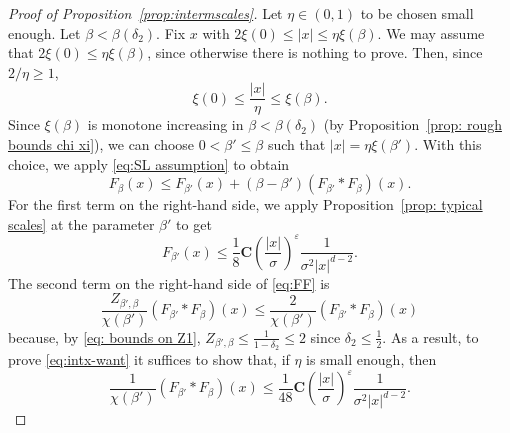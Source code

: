 \documentclass[11pt,a4paper]{article}
\numberwithin{equation}{section}
\theoremstyle{plain}
\theoremstyle{definition}
\newcommand\1{\mathds{1}}
\newcommand\bfC{\mathbf{C}}
\begin{document}
\begin{proof}[Proof of Proposition~\textup{\ref{prop:intermscales}}]
Let $\eta\in(0,1)$ to be chosen small enough.
Let $\beta<\beta(\delta_2)$.
Fix $x$ with $2\xi(0)\leq |x|\leq \eta \xi(\beta)$.
We may assume that $2\xi(0) \le \eta \xi(\beta)$, since otherwise there is nothing to prove. Then, since $2/\eta \ge 1$,
\begin{equation}
    \xi(0)  \le \frac{|x|}\eta \le \xi(\beta).
\end{equation}
Since $\xi(\beta)$ is monotone increasing in
$\beta <\beta(\delta_2)$ (by Proposition~\ref{prop: rough bounds chi xi}), we can choose
$0< \beta' \le \beta$ such that
$|x|=\eta\xi(\beta')$.  With this choice, we apply
\eqref{eq:SL assumption} to obtain
\begin{equation}
\label{eq:FF}
	F_\beta(x)\leq F_{\beta'}(x)+(\beta-\beta')(F_{\beta'}*F_\beta)(x).
\end{equation}
For the first term on the right-hand side, we
apply Proposition~\ref{prop: typical scales} at the parameter $\beta'$ to get
\begin{equation}
	F_{\beta'}(x)\leq
    \frac{1}{8} \bfC \left(\frac{|x|}{\sigma}\right)^\varepsilon
    \frac{1}{\sigma^2 |x|^{d-2}}.
\end{equation}
The second term on the right-hand side of \eqref{eq:FF} is
\begin{equation}
    \frac{Z_{\beta',\beta}}{\chi(\beta')}
    (F_{\beta'}*F_\beta)(x)
    \le
    \frac{2}{\chi(\beta')}
    (F_{\beta'}*F_\beta)(x)
\end{equation}
because, by \eqref{eq: bounds on Z1}, $Z_{\beta',\beta}\leq \tfrac{1}{1-\delta_2}\leq 2$
since $\delta_2 \le \frac 12$.
As a result, to prove \eqref{eq:intx-want} it suffices to show that, if $\eta$ is small enough, then
\begin{equation}\label{eq: interm improv 1}
    \frac{1}{\chi(\beta')}
    (F_{\beta'}*F_\beta)(x)
    \leq
    \frac{1}{48} \bfC \left(\frac{|x|}{\sigma}\right)^\varepsilon
    \frac{1}{\sigma^2 |x|^{d-2}}.
\end{equation}


\end{proof}
\end{document}
